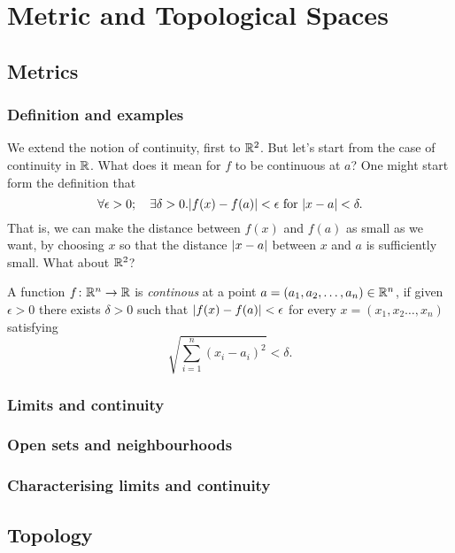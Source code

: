 \documentclass[main.tex]{subfiles}
\begin{document}
	\chapter{Metric and Topological Spaces}
		\section{Metrics}
			\subsection{Definition and examples}
				We extend the notion of continuity, first to $\mathbb R^2$.
				But let's start from the case of continuity in $\mathbb R$. What does it mean for $f$ to be continuous at $a$? One might start form the definition that
				\begin{equation*}
					\forall\epsilon > 0;\quad \exists\delta > 0. \lvert f(x) - f(a)\rvert < \epsilon \text{ for } \lvert x - a\rvert < \delta.
				\end{equation*}
				That is, we can make the distance between $f(x)$ and $f(a)$ as small as we want, by choosing $x$ so that the distance $\lvert x - a\rvert$ between $x$ and $a$ is sufficiently small. What about $\mathbb R^2$?
				\begin{definition}
					A function $f \colon \mathbb R^n \rightarrow \mathbb R$ is \textit{continous} at a point $a = (a_1, a_2, \ldots, a_n) \in \mathbb R^n$, if given $\epsilon >0$ there exists $\delta > 0$ such that $\lvert f(x) - f(a)\rvert < \epsilon$ for every $x = (x_1, x_2 \ldots, x_n)$ satisfying
					\begin{equation*}
						\sqrt{\sum_{i = 1}^{n} \left(x_i - a_i\right)^2} < \delta.
					\end{equation*}
				\end{definition}
			\subsection{Limits and continuity}
			
			\subsection{Open sets and neighbourhoods}
			
			\subsection{Characterising limits and continuity}
			
		\section{Topology}
\end{document}
